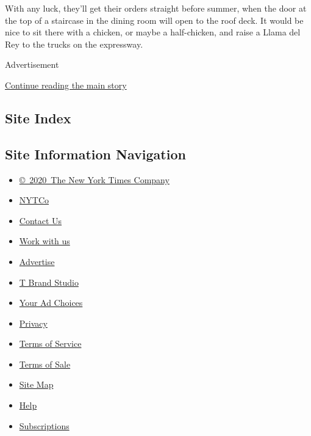 With any luck, they'll get their orders straight before summer, when the
door at the top of a staircase in the dining room will open to the roof
deck. It would be nice to sit there with a chicken, or maybe a
half-chicken, and raise a Llama del Rey to the trucks on the expressway.

Advertisement

\protect\hyperlink{after-bottom}{Continue reading the main story}

\hypertarget{site-index}{%
\subsection{Site Index}\label{site-index}}

\hypertarget{site-information-navigation}{%
\subsection{Site Information
Navigation}\label{site-information-navigation}}

\begin{itemize}
\tightlist
\item
  \href{https://help.nytimes3xbfgragh.onion/hc/en-us/articles/115014792127-Copyright-notice}{©~2020~The
  New York Times Company}
\end{itemize}

\begin{itemize}
\tightlist
\item
  \href{https://www.nytco.com/}{NYTCo}
\item
  \href{https://help.nytimes3xbfgragh.onion/hc/en-us/articles/115015385887-Contact-Us}{Contact
  Us}
\item
  \href{https://www.nytco.com/careers/}{Work with us}
\item
  \href{https://nytmediakit.com/}{Advertise}
\item
  \href{http://www.tbrandstudio.com/}{T Brand Studio}
\item
  \href{https://www.nytimes3xbfgragh.onion/privacy/cookie-policy\#how-do-i-manage-trackers}{Your
  Ad Choices}
\item
  \href{https://www.nytimes3xbfgragh.onion/privacy}{Privacy}
\item
  \href{https://help.nytimes3xbfgragh.onion/hc/en-us/articles/115014893428-Terms-of-service}{Terms
  of Service}
\item
  \href{https://help.nytimes3xbfgragh.onion/hc/en-us/articles/115014893968-Terms-of-sale}{Terms
  of Sale}
\item
  \href{https://spiderbites.nytimes3xbfgragh.onion}{Site Map}
\item
  \href{https://help.nytimes3xbfgragh.onion/hc/en-us}{Help}
\item
  \href{https://www.nytimes3xbfgragh.onion/subscription?campaignId=37WXW}{Subscriptions}
\end{itemize}
